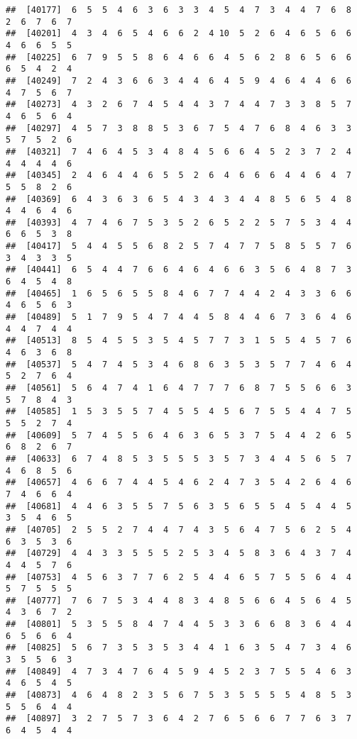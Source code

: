 \documentclass[
]{book}
\begin{document}
\begin{verbatim}
##  [40177]  6  5  5  4  6  3  6  3  3  4  5  4  7  3  4  4  7  6  8  2  6  7  6  7
##  [40201]  4  3  4  6  5  4  6  6  2  4 10  5  2  6  4  6  5  6  6  4  6  6  5  5
##  [40225]  6  7  9  5  5  8  6  4  6  6  4  5  6  2  8  6  5  6  6  6  5  4  2  4
##  [40249]  7  2  4  3  6  6  3  4  4  6  4  5  9  4  6  4  4  6  6  4  7  5  6  7
##  [40273]  4  3  2  6  7  4  5  4  4  3  7  4  4  7  3  3  8  5  7  4  6  5  6  4
##  [40297]  4  5  7  3  8  8  5  3  6  7  5  4  7  6  8  4  6  3  3  5  7  5  2  6
##  [40321]  7  4  6  4  5  3  4  8  4  5  6  6  4  5  2  3  7  2  4  4  4  4  4  6
##  [40345]  2  4  6  4  4  6  5  5  2  6  4  6  6  6  4  4  6  4  7  5  5  8  2  6
##  [40369]  6  4  3  6  3  6  5  4  3  4  3  4  4  8  5  6  5  4  8  4  4  6  4  6
##  [40393]  4  7  4  6  7  5  3  5  2  6  5  2  2  5  7  5  3  4  4  6  6  5  3  8
##  [40417]  5  4  4  5  5  6  8  2  5  7  4  7  7  5  8  5  5  7  6  3  4  3  3  5
##  [40441]  6  5  4  4  7  6  6  4  6  4  6  6  3  5  6  4  8  7  3  6  4  5  4  8
##  [40465]  1  6  5  6  5  5  8  4  6  7  7  4  4  2  4  3  3  6  6  4  6  5  6  3
##  [40489]  5  1  7  9  5  4  7  4  4  5  8  4  4  6  7  3  6  4  6  4  4  7  4  4
##  [40513]  8  5  4  5  5  3  5  4  5  7  7  3  1  5  5  4  5  7  6  4  6  3  6  8
##  [40537]  5  4  7  4  5  3  4  6  8  6  3  5  3  5  7  7  4  6  4  5  2  7  6  4
##  [40561]  5  6  4  7  4  1  6  4  7  7  7  6  8  7  5  5  6  6  3  5  7  8  4  3
##  [40585]  1  5  3  5  5  7  4  5  5  4  5  6  7  5  5  4  4  7  5  5  5  2  7  4
##  [40609]  5  7  4  5  5  6  4  6  3  6  5  3  7  5  4  4  2  6  5  6  8  2  6  7
##  [40633]  6  7  4  8  5  3  5  5  5  3  5  7  3  4  4  5  6  5  7  4  6  8  5  6
##  [40657]  4  6  6  7  4  4  5  4  6  2  4  7  3  5  4  2  6  4  6  7  4  6  6  4
##  [40681]  4  4  6  3  5  5  7  5  6  3  5  6  5  5  4  5  4  4  5  3  5  4  6  5
##  [40705]  2  5  5  2  7  4  4  7  4  3  5  6  4  7  5  6  2  5  4  6  3  5  3  6
##  [40729]  4  4  3  3  5  5  5  2  5  3  4  5  8  3  6  4  3  7  4  4  4  5  7  6
##  [40753]  4  5  6  3  7  7  6  2  5  4  4  6  5  7  5  5  6  4  4  5  7  5  5  5
##  [40777]  7  6  7  5  3  4  4  8  3  4  8  5  6  6  4  5  6  4  5  4  3  6  7  2
##  [40801]  5  3  5  5  8  4  7  4  4  5  3  3  6  6  8  3  6  4  4  6  5  6  6  4
##  [40825]  5  6  7  3  5  3  5  3  4  4  1  6  3  5  4  7  3  4  6  3  5  5  6  3
##  [40849]  4  7  3  4  7  6  4  5  9  4  5  2  3  7  5  5  4  6  3  4  6  5  4  5
##  [40873]  4  6  4  8  2  3  5  6  7  5  3  5  5  5  5  4  8  5  3  5  5  6  4  4
##  [40897]  3  2  7  5  7  3  6  4  2  7  6  5  6  6  7  7  6  3  7  6  4  5  4  4

\end{verbatim}
\end{document}
